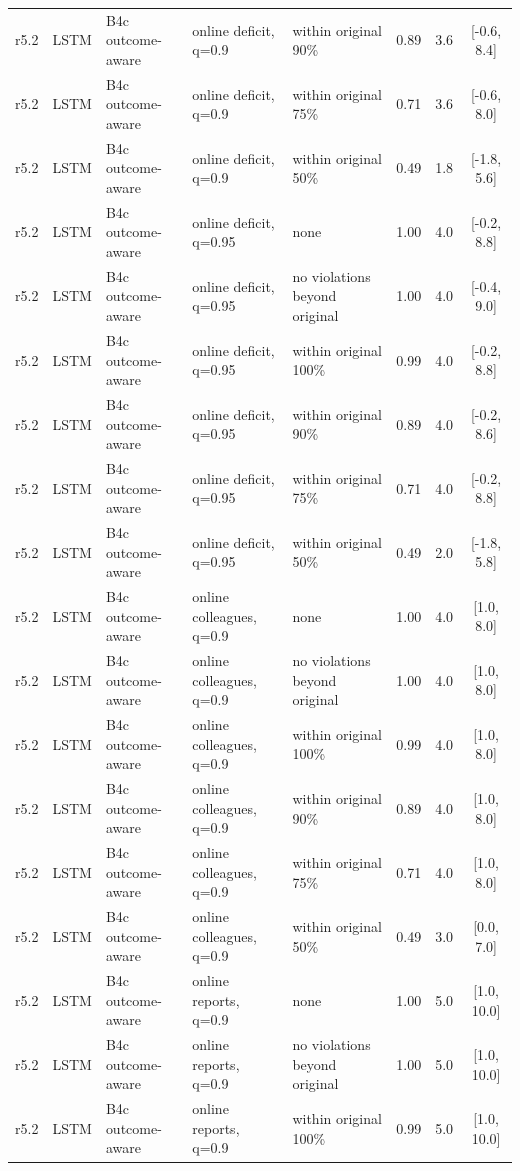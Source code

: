 \documentclass[10pt,onecolumn,letterpaper]{article}
\begin{document}
\begin{longtable}{lllp{4.2cm}p{3.4cm}ccc}
r5.2 & LSTM & B4c outcome-aware & online deficit, q=0.9 & within original 90\% & 0.89 & 3.6 & [-0.6, 8.4] \\
r5.2 & LSTM & B4c outcome-aware & online deficit, q=0.9 & within original 75\% & 0.71 & 3.6 & [-0.6, 8.0] \\
r5.2 & LSTM & B4c outcome-aware & online deficit, q=0.9 & within original 50\% & 0.49 & 1.8 & [-1.8, 5.6] \\
r5.2 & LSTM & B4c outcome-aware & online deficit, q=0.95 & none & 1.00 & 4.0 & [-0.2, 8.8] \\
r5.2 & LSTM & B4c outcome-aware & online deficit, q=0.95 & no violations beyond original & 1.00 & 4.0 & [-0.4, 9.0] \\
r5.2 & LSTM & B4c outcome-aware & online deficit, q=0.95 & within original 100\% & 0.99 & 4.0 & [-0.2, 8.8] \\
r5.2 & LSTM & B4c outcome-aware & online deficit, q=0.95 & within original 90\% & 0.89 & 4.0 & [-0.2, 8.6] \\
r5.2 & LSTM & B4c outcome-aware & online deficit, q=0.95 & within original 75\% & 0.71 & 4.0 & [-0.2, 8.8] \\
r5.2 & LSTM & B4c outcome-aware & online deficit, q=0.95 & within original 50\% & 0.49 & 2.0 & [-1.8, 5.8] \\
r5.2 & LSTM & B4c outcome-aware & online colleagues, q=0.9 & none & 1.00 & 4.0 & [1.0, 8.0] \\
r5.2 & LSTM & B4c outcome-aware & online colleagues, q=0.9 & no violations beyond original & 1.00 & 4.0 & [1.0, 8.0] \\
r5.2 & LSTM & B4c outcome-aware & online colleagues, q=0.9 & within original 100\% & 0.99 & 4.0 & [1.0, 8.0] \\
r5.2 & LSTM & B4c outcome-aware & online colleagues, q=0.9 & within original 90\% & 0.89 & 4.0 & [1.0, 8.0] \\
r5.2 & LSTM & B4c outcome-aware & online colleagues, q=0.9 & within original 75\% & 0.71 & 4.0 & [1.0, 8.0] \\
r5.2 & LSTM & B4c outcome-aware & online colleagues, q=0.9 & within original 50\% & 0.49 & 3.0 & [0.0, 7.0] \\
r5.2 & LSTM & B4c outcome-aware & online reports, q=0.9 & none & 1.00 & 5.0 & [1.0, 10.0] \\
r5.2 & LSTM & B4c outcome-aware & online reports, q=0.9 & no violations beyond original & 1.00 & 5.0 & [1.0, 10.0] \\
r5.2 & LSTM & B4c outcome-aware & online reports, q=0.9 & within original 100\% & 0.99 & 5.0 & [1.0, 10.0] \\

\end{longtable}
\end{document}
